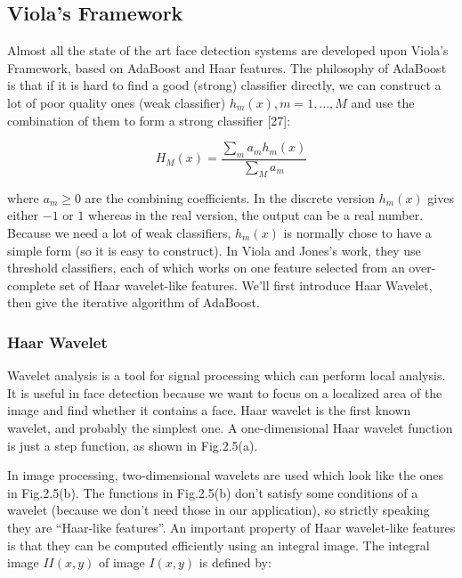 \subsection{Viola's Framework}
\par
Almost all the state of the art face detection systems are developed upon Viola’s Framework, based on AdaBoost and Haar features. The philosophy of AdaBoost is that if it is hard to find a good (strong) classifier directly, we can construct a lot of poor quality ones (weak classifier) $h_m (x) ,m = 1, . . . , M$ and use the combination of them to form a strong classifier [27]:

\begin{equation}
    H_M(x) = \frac{\sum_m{a_mh_m(x)}}{\sum_M{a_m}}
\end{equation}

where $a_m ≥ 0$ are the combining coefficients. In the discrete version $h_m(x)$ gives either $−1$
or $1$ whereas in the real version, the output can be a real number. Because we need a lot of weak classifiers, $h_m(x)$ is normally chose to have a simple form (so it is easy to construct). In Viola and Jones’s work, they use threshold classifiers, each of which works on one feature selected from an over-complete set of Haar wavelet-like features. We’ll first introduce Haar Wavelet, then give the iterative algorithm of AdaBoost.

\subsubsection{Haar Wavelet}

\par
Wavelet analysis is a tool for signal processing which can perform local analysis. It is useful in face detection because we want to focus on a localized area of the image and find whether it contains a face. Haar wavelet is the first known wavelet, and probably the simplest one. A one-dimensional Haar wavelet function is just a step function, as shown in Fig.2.5(a).

\par
In image processing, two-dimensional wavelets are used which look like the ones in Fig.2.5(b). The functions in Fig.2.5(b) don’t satisfy some conditions of a wavelet (because we don’t need those in our application), so strictly speaking they are ``Haar-like features''. An important property of Haar wavelet-like features is that they can be computed efficiently using an integral image. The integral image $II(x, y)$ of image $I(x, y)$ is
defined by:

